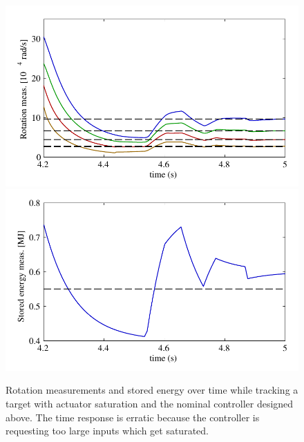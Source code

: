 \documentclass[12pt,lot, lof]{puthesis}
\begin{document}
\begin{figure}[htbp]
	\centering
	\includegraphics{chap10/fast_y_sat_aw_rotation}
	\includegraphics{chap10/fast_y_sat_aw_energy}
	\caption{Rotation measurements and stored energy over time while tracking a target with actuator saturation and the nominal controller designed above.
		The time response is erratic because the controller is requesting too large inputs which get saturated.}
	\label{fig:best_y_sat}
\end{figure}
\end{document}
